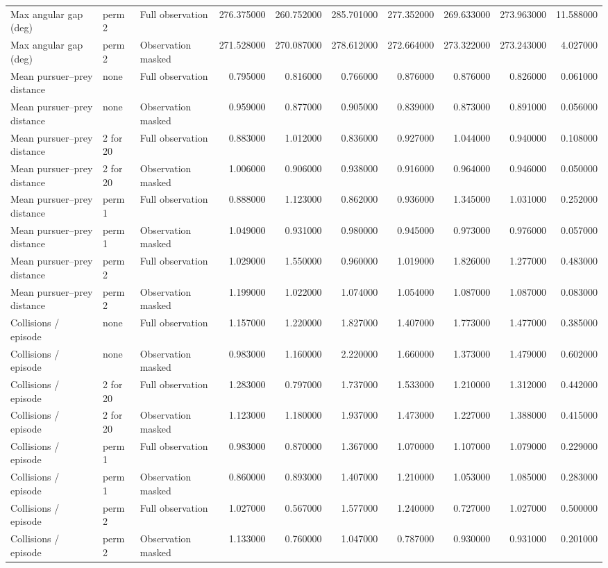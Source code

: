 \begin{tabular}{lllrrrrrrr}
Max angular gap (deg) & perm  2 & Full observation & 276.375000 & 260.752000 & 285.701000 & 277.352000 & 269.633000 & 273.963000 & 11.588000 \\
Max angular gap (deg) & perm  2 & Observation masked & 271.528000 & 270.087000 & 278.612000 & 272.664000 & 273.322000 & 273.243000 & 4.027000 \\
Mean pursuer–prey distance & none & Full observation & 0.795000 & 0.816000 & 0.766000 & 0.876000 & 0.876000 & 0.826000 & 0.061000 \\
Mean pursuer–prey distance & none & Observation masked & 0.959000 & 0.877000 & 0.905000 & 0.839000 & 0.873000 & 0.891000 & 0.056000 \\
Mean pursuer–prey distance & 2 for 20 & Full observation & 0.883000 & 1.012000 & 0.836000 & 0.927000 & 1.044000 & 0.940000 & 0.108000 \\
Mean pursuer–prey distance & 2 for 20 & Observation masked & 1.006000 & 0.906000 & 0.938000 & 0.916000 & 0.964000 & 0.946000 & 0.050000 \\
Mean pursuer–prey distance & perm  1 & Full observation & 0.888000 & 1.123000 & 0.862000 & 0.936000 & 1.345000 & 1.031000 & 0.252000 \\
Mean pursuer–prey distance & perm  1 & Observation masked & 1.049000 & 0.931000 & 0.980000 & 0.945000 & 0.973000 & 0.976000 & 0.057000 \\
Mean pursuer–prey distance & perm  2 & Full observation & 1.029000 & 1.550000 & 0.960000 & 1.019000 & 1.826000 & 1.277000 & 0.483000 \\
Mean pursuer–prey distance & perm  2 & Observation masked & 1.199000 & 1.022000 & 1.074000 & 1.054000 & 1.087000 & 1.087000 & 0.083000 \\
Collisions / episode & none & Full observation & 1.157000 & 1.220000 & 1.827000 & 1.407000 & 1.773000 & 1.477000 & 0.385000 \\
Collisions / episode & none & Observation masked & 0.983000 & 1.160000 & 2.220000 & 1.660000 & 1.373000 & 1.479000 & 0.602000 \\
Collisions / episode & 2 for 20 & Full observation & 1.283000 & 0.797000 & 1.737000 & 1.533000 & 1.210000 & 1.312000 & 0.442000 \\
Collisions / episode & 2 for 20 & Observation masked & 1.123000 & 1.180000 & 1.937000 & 1.473000 & 1.227000 & 1.388000 & 0.415000 \\
Collisions / episode & perm  1 & Full observation & 0.983000 & 0.870000 & 1.367000 & 1.070000 & 1.107000 & 1.079000 & 0.229000 \\
Collisions / episode & perm  1 & Observation masked & 0.860000 & 0.893000 & 1.407000 & 1.210000 & 1.053000 & 1.085000 & 0.283000 \\
Collisions / episode & perm  2 & Full observation & 1.027000 & 0.567000 & 1.577000 & 1.240000 & 0.727000 & 1.027000 & 0.500000 \\
Collisions / episode & perm  2 & Observation masked & 1.133000 & 0.760000 & 1.047000 & 0.787000 & 0.930000 & 0.931000 & 0.201000 \\
\bottomrule
\end{tabular}
